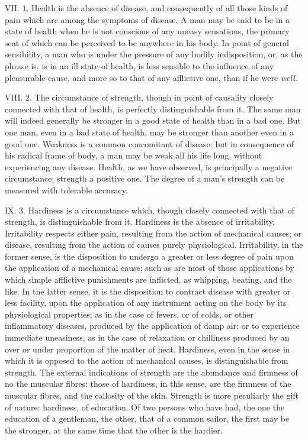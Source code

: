 \documentclass[12pt]{report}
\begin{document}
VII. 1. Health is the absence of disease, and consequently of all those
kinds of pain which are among the symptoms of disease. A man may be said
to be in a state of health when he is not conscious of any uneasy
sensations, the primary seat of which can be perceived to be anywhere in
his body. In point of general sensibility, a man who is under the
pressure of any bodily indisposition, or, as the phrase is, is in an ill
state of health, is less sensible to the influence of any pleasurable
cause, and more so to that of any afflictive one, than if he were
\emph{well.}

VIII. 2. The circumstance of strength, though in point of causality
closely connected with that of health, is perfectly distinguishable from
it. The same man will indeed generally be stronger in a good state of
health than in a bad one. But one man, even in a bad state of health,
may be stronger than another even in a good one. Weakness is a common
concomitant of disease: but in consequence of his radical frame of body,
a man may be weak all his life long, without experiencing any disease.
Health, as we have observed, is principally a negative circumstance:
strength a positive one. The degree of a man's strength can be measured
with tolerable accuracy.

IX. 3. Hardiness is a circumstance which, though closely connected with
that of strength, is distinguishable from it. Hardiness is the absence
of irritability. Irritability respects either pain, resulting from the
action of mechanical causes; or disease, resulting from the action of
causes purely physiological. Irritability, in the former sense, is the
disposition to undergo a greater or less degree of pain upon the
application of a mechanical cause; such as are most of those
applications by which simple afflictive punishments are inflicted, as
whipping, beating, and the like. In the latter sense, it is the
disposition to contract disease with greater or less facility, upon the
application of any instrument acting on the body by its physiological
properties; as in the case of fevers, or of colds, or other inflammatory
diseases, produced by the application of damp air: or to experience
immediate uneasiness, as in the case of relaxation or chilliness
produced by an over or under proportion of the matter of heat.
Hardiness, even in the sense in which it is opposed to the action of
mechanical causes, is distinguishable from strength. The external
indications of strength are the abundance and firmness of no the
muscular fibres: those of hardiness, in this sense, are the firmness of
the muscular fibres, and the callosity of the skin. Strength is more
peculiarly the gift of nature: hardiness, of education. Of two persons
who have had, the one the education of a gentleman, the other, that of a
common sailor, the first may be the stronger, at the same time that the
other is the hardier.
\end{document}
